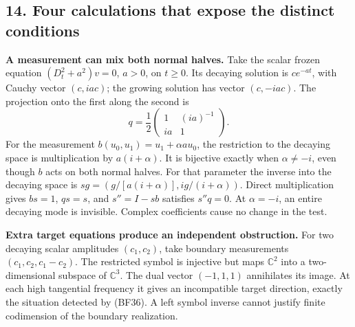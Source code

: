 \documentclass[
  11pt,
]{article}
\makeatletter
\let\ReaderOriginalAnchorStart\hyper@anchorstart
\let\ReaderOriginalAnchorEnd\hyper@anchorend
\let\ReaderPendingAliases\@empty
\def\ReaderArmAliases#1{\gdef\ReaderPendingAliases{#1}}
\def\hyper@anchorstart#1{\ReaderIfNativeAnchorTF{#1}{\ReaderPendingAliases\global\let\ReaderPendingAliases\@empty}{}\ReaderOriginalAnchorStart{#1}}
\makeatother
\begin{document}
\ReaderArmAliases{\ReaderOriginalAnchorStart{AN03-GFB-EX-001}\ReaderOriginalAnchorEnd\begingroup\expandafter\def\csname @currentHref\endcsname{AN03-GFB-EX-001}\label{AN03-GFB-EX-001}\endgroup\ReaderOriginalAnchorStart{an03-gfb-ex-001-four-calculations-that-expose-the-distinct-conditions}\ReaderOriginalAnchorEnd\begingroup\expandafter\def\csname @currentHref\endcsname{an03-gfb-ex-001-four-calculations-that-expose-the-distinct-conditions}\label{an03-gfb-ex-001-four-calculations-that-expose-the-distinct-conditions}\endgroup\ReaderOriginalAnchorStart{14-four-calculations-that-expose-the-distinct-conditions}\ReaderOriginalAnchorEnd\begingroup\expandafter\def\csname @currentHref\endcsname{14-four-calculations-that-expose-the-distinct-conditions}\label{14-four-calculations-that-expose-the-distinct-conditions}\endgroup\ReaderOriginalAnchorStart{four-calculations-that-expose-the-distinct-conditions}\ReaderOriginalAnchorEnd}
\subsection{14. Four calculations that expose the distinct
conditions}\label{four-calculations-that-expose-the-distinct-conditions}

\textbf{A measurement can mix both normal halves.} Take the scalar
frozen equation \((D_t^2+a^2)v=0\), \(a>0\), on \(t\geq0\). Its decaying
solution is \(ce^{-at}\), with Cauchy vector \((c,ia c)\); the growing
solution has vector \((c,-ia c)\). The projection onto the first along
the second is \[
 q=\frac12\begin{pmatrix}1&(ia)^{-1}\\ia&1\end{pmatrix}.
 \tag{BF44}
\] For the measurement \(b(u_0,u_1)=u_1+\alpha a u_0\), the restriction
to the decaying space is multiplication by \(a(i+\alpha)\). It is
bijective exactly when \(\alpha\ne-i\), even though \(b\) acts on both
normal halves. For that parameter the inverse into the decaying space is
\(sg=(g/[a(i+\alpha)],ig/(i+\alpha))\). Direct multiplication gives
\(bs=1\), \(qs=s\), and \(s''=I-sb\) satisfies \(s''q=0\). At
\(\alpha=-i\), an entire decaying mode is invisible. Complex
coefficients cause no change in the test.

\textbf{Extra target equations produce an independent obstruction.} For
two decaying scalar amplitudes \((c_1,c_2)\), take boundary measurements
\((c_1,c_2,c_1-c_2)\). The restricted symbol is injective but maps
\(\mathbb C^2\) into a two-dimensional subspace of \(\mathbb C^3\). The
dual vector \((-1,1,1)\) annihilates its image. At each high tangential
frequency it gives an incompatible target direction, exactly the
situation detected by (BF36). A left symbol inverse cannot justify
finite codimension of the boundary realization.
\end{document}
